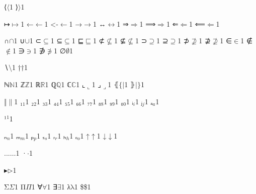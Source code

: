 {%
{⟨}{{\ensuremath{\langle}}}1
{⟩}{{\ensuremath{\rangle}}}1

{↦}{{\ensuremath{\mapsto}}}1
{←}{{\ensuremath{\leftarrow}}}1
{<-}{{\ensuremath{\leftarrow}}}1
{→}{{\ensuremath{\rightarrow}}}1
{↔}{{\ensuremath{\leftrightarrow}}}1
{⇒}{{\ensuremath{\Rightarrow}}}1
{⟹}{{\ensuremath{\Longrightarrow}}}1
{⇐}{{\ensuremath{\Leftarrow}}}1
{⟸}{{\ensuremath{\Longleftarrow}}}1

{∩}{{\ensuremath{\cap}}}1
{∪}{{\ensuremath{\cup}}}1
{⊂}{{\ensuremath{\subseteq}}}1
{⊆}{{\ensuremath{\subseteq}}}1
{⊑}{{\ensuremath{\sqsubseteq}}}1
{⊄}{{\ensuremath{\nsubseteq}}}1
{⊈}{{\ensuremath{\nsubseteq}}}1
{⊃}{{\ensuremath{\supseteq}}}1
{⊇}{{\ensuremath{\supseteq}}}1
{⊅}{{\ensuremath{\nsupseteq}}}1
{⊉}{{\ensuremath{\nsupseteq}}}1
{∈}{{\ensuremath{\in}}}1
{∉}{{\ensuremath{\notin}}}1
{∋}{{\ensuremath{\ni}}}1
{∌}{{\ensuremath{\notni}}}1
{∅}{{\ensuremath{\emptyset}}}1

{∖}{{\ensuremath{\setminus}}}1
{†}{{\ensuremath{\dag}}}1

{ℕ}{{\ensuremath{\mathbb{N}}}}1
{ℤ}{{\ensuremath{\mathbb{Z}}}}1
{ℝ}{{\ensuremath{\mathbb{R}}}}1
{ℚ}{{\ensuremath{\mathbb{Q}}}}1
{ℂ}{{\ensuremath{\mathbb{C}}}}1
{⌞}{{\ensuremath{\llcorner}}}1
{⌟}{{\ensuremath{\lrcorner}}}1
{⦃}{{\ensuremath{\{\!|}}}1
{⦄}{{\ensuremath{|\!\}}}}1

{‖}{{\ensuremath{\|}}}1
{₁}{{\ensuremath{_1}}}1
{₂}{{\ensuremath{_2}}}1
{₃}{{\ensuremath{_3}}}1
{₄}{{\ensuremath{_4}}}1
{₅}{{\ensuremath{_5}}}1
{₆}{{\ensuremath{_6}}}1
{₇}{{\ensuremath{_7}}}1
{₈}{{\ensuremath{_8}}}1
{₉}{{\ensuremath{_9}}}1
{₀}{{\ensuremath{_0}}}1
{ᵢ}{{\ensuremath{_i}}}1
{ⱼ}{{\ensuremath{_j}}}1
{ₐ}{{\ensuremath{_a}}}1

{¹}{{\ensuremath{^1}}}1

{ₙ}{{\ensuremath{_n}}}1
{ₘ}{{\ensuremath{_m}}}1
{ₚ}{{\ensuremath{_p}}}1
{ₛ}{{\ensuremath{_s}}}1
{ᵣ}{{\ensuremath{_r}}}1
{ₕ}{{\ensuremath{_h}}}1
{ₒ}{{\ensuremath{_o}}}1
{↑}{{\ensuremath{\uparrow}}}1
{↓}{{\ensuremath{\downarrow}}}1

{...}{{\ensuremath{\ldots}}}1
{·}{{\ensuremath{\cdot}}}1

{▸}{{\ensuremath{\triangleright}}}1

{Σ}{{\color{symbolcolor}\ensuremath{\Sigma}}}1
{Π}{{\color{symbolcolor}\ensuremath{\Pi}}}1
{∀}{{\color{symbolcolor}\ensuremath{\forall}}}1
{∃}{{\color{symbolcolor}\ensuremath{\exists}}}1
{λ}{{\color{symbolcolor}\ensuremath{\mathrm{\lambda}}}}1
{\$}{{\color{symbolcolor}\$}}1

}
